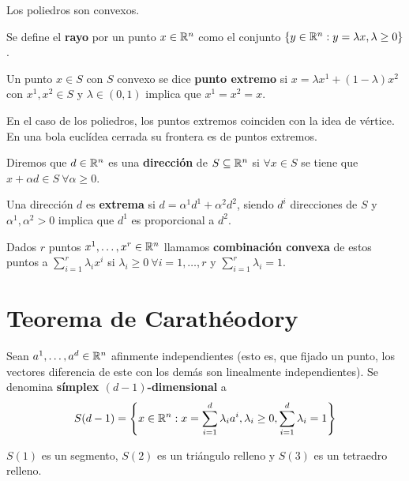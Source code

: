\documentclass[PM.tex]{subfiles}
\begin{document}
\begin{coro}
Los poliedros son convexos.
\end{coro}

\begin{defi}
Se define el \textbf{rayo} por un punto $x\in\mathbb{R}^n$ como el conjunto $\left\{y\in\mathbb{R}^n: y=\lambda x, \lambda\geq 0\right\}$.
\end{defi}

\begin{defi}
Un punto $x\in S$ con $S$ convexo se dice \textbf{punto extremo} si $x=\lambda x^1 +(1-\lambda)x^2$ con $x^1,x^2\in S$ y $\lambda\in (0,1)$ implica que $x^1=x^2=x$.
\end{defi}
\begin{nota}  En el caso de los poliedros, los puntos extremos coinciden con la idea de vértice. En una bola euclídea cerrada su frontera es de puntos extremos.
\end{nota}

\begin{defi}
Diremos que $d\in\mathbb{R}^n$ es una \textbf{dirección} de $S\subseteq\mathbb{R}^n$ si $\forall x\in S$ se tiene que $x+\alpha d\in S\ \forall\alpha\geq 0$.
\end{defi}

\begin{defi} Una dirección $d$ es \textbf{extrema} si $d=\alpha^1d^1+\alpha^2d^2$, siendo $d^i$ direcciones de $S$ y $\alpha^1,\alpha^2>0$ implica que $d^1$ es proporcional a $d^2$.
\end{defi}

\begin{defi}
Dados $r$ puntos $x^1,\dots, x^r\in\mathbb{R}^n$ llamamos \textbf{combinación convexa} de estos puntos a $\sum_{i=1}^r\lambda_i x^i$ si $\lambda_i\geq 0\ \forall i=1,\dots, r$ y $\sum_{i=1}^r\lambda_i=1$.
\end{defi}

\section{Teorema de Carathéodory}
\begin{defi} Sean $a^1,\dots, a^d\in\mathbb{R}^n$ afinmente independientes (esto es, que fijado un punto, los vectores diferencia de este con los demás son linealmente independientes). Se denomina \textbf{símplex $(d-1)$-dimensional} a 
\[
S(d-1)= \left\{x\in\mathbb{R}^n:x=\sum_{i=1}^d\lambda_i a^i,\lambda_i\geq 0, \sum_{i=1}^d\lambda_i =1\right\}
\]
\end{defi}
\begin{example}
$S(1)$ es un segmento, $S(2)$ es un triángulo relleno y $S(3)$ es un tetraedro relleno.
\end{example}
\end{document}
